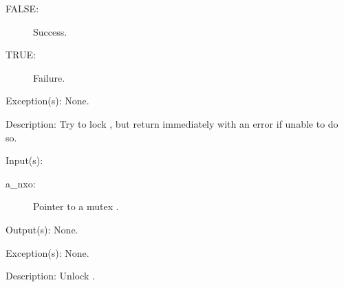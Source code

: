 \begin{capi}
\begin{capilist}
\begin{description}
			\begin{description}\item[]
			\item[FALSE: ]
				Success.
			\item[TRUE: ]
				Failure.
			\end{description}
		\end{description}
	\item[Exception(s): ] None.
	\item[Description: ]
		Try to lock , but return immediately with an error
		if unable to do so.
	\end{capilist}
\label{nxo_mutex_unlock}
	\begin{capilist}
	\item[Input(s): ]
		\begin{description}\item[]
		\item[a\_nxo: ]
			Pointer to a mutex .
		\end{description}
	\item[Output(s): ] None.
	\item[Exception(s): ] None.
	\item[Description: ]
		Unlock .
	\end{capilist}
\end{capi}
